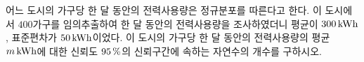 어느 도시의 가구당 한 달 동안의 전력사용량은 정규분포를 따른다고 한다. 이 도시에서 $400$가구를 임의추출하여 한 달 동안의 전력사용량을 조사하였더니 평균이 $300\mkern3mu \mathrm{kWh}$, 표준편차가 $50\mkern3mu \mathrm{kWh}$이었다. 이 도시의 가구당 한 달 동안의 전력사용량의 평균 $m\mkern3mu \mathrm{kWh}$에 대한 신뢰도 $95\mkern3mu \%$의 신뢰구간에 속하는 자연수의 개수를 구하시오. 
